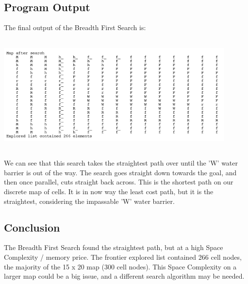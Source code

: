 \documentclass[12pt]{article}
\begin{document}
\subsection{Program Output}
The final output of the Breadth First Search is:
\\
\begin{center}
\includegraphics[width=120mm,height=60mm]{images/breadth/final_breadth_map.png}
\end{center}
We can see that this search takes the straightest path over until the 'W' water barrier is out of the way. The search goes straight down towards the goal, and then once parallel, cuts straight back across. This is the shortest path on our discrete map of cells. It is in now way the least cost path, but it is the straightest, considering the impassable 'W' water barrier.
\subsection{Conclusion}
The Breadth First Search found the straightest path, but at a high Space Complexity / memory price. The frontier explored list contained 266 cell nodes, the majority of the 15 x 20 map (300 cell nodes). This Space Complexity on a larger map could be a big issue, and a different search algorithm may be needed.
\end{document}
